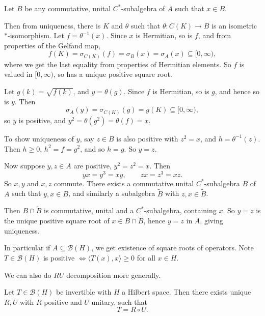 \documentclass[12pt]{article}
\begin{document}
\begin{proofbox}
	Let $B$ be any commutative, unital $C^{\ast}$-subalgebra of $A$ such that $x \in B$.

	Then from uniqueness, there is $K$ and $\theta$ such that $\theta : C(K) \to B$ is an isometric $\ast$-isomorphism. Let $f = \theta^{-1}(x)$. Since $x$ is Hermitian, so is $f$, and from properties of the Gelfand map,
	\[
	f(K) = \sigma_{C(K)}(f) = \sigma_B(x) = \sigma_A(x) \subseteq [0, \infty),
	\]
	where we get the last equality from properties of Hermitian elements. So $f$ is valued in $[0, \infty)$, so has a unique positive square root.

	Let $g(k) = \sqrt{f(k)}$, and $y = \theta(g)$. Since $f$ is Hermitian, so is $g$, and hence so is $y$. Then
	\[
	\sigma_A(y) = \sigma_{C(K)}(g) = g(K) \subseteq [0, \infty),
	\]
	so $y$ is positive, and $y^2 = \theta(g^2) = \theta(f) = x$.

	To show uniqueness of $y$, say $z \in B$ is also positive with $z^2 = x$, and $h = \theta^{-1}(z)$. Then $h \geq 0$, $h^2 = f = g^2$, and so $h = g$. So $y = z$.

	Now suppose $y, z \in A$ are positive, $y^2 = z^2 = x$. Then
	\[
	yx = y^3 = xy, \qquad zx = z^3 = xz.
	\]
	So $x, y$ and $x, z$ commute. There exists a commutative unital $C^{\ast}$-subalgebra $B$ of $A$ such that $y, x \in B$, and similarly a subalgebra $\tilde B$ with $z, x \in \tilde B$.

	Then $B \cap \tilde B$ is commutative, unital and a $C^{\ast}$-subalgebra, containing $x$. So $y = z$ is the unique positive square root of $x \in B \cap \tilde B$, hence $y = z$ in $A$, giving uniqueness.
\end{proofbox}

In particular if $A \subseteq \mathcal{B}(H)$, we get existence of square roots of operators. Note $T \in \mathcal{B}(H)$ is positive $\iff \langle T(x), x \rangle \geq 0$ for all $x \in H$.

We can also do $RU$ decomposition more generally.

\begin{proposition}
	Let $T \in \mathcal{B}(H)$ be invertible with $H$ a Hilbert space. Then there exists unique $R, U$ with $R$ positive and $U$ unitary, such that
	\[
	T = R \circ U.
	\]
\end{proposition}
\end{document}
